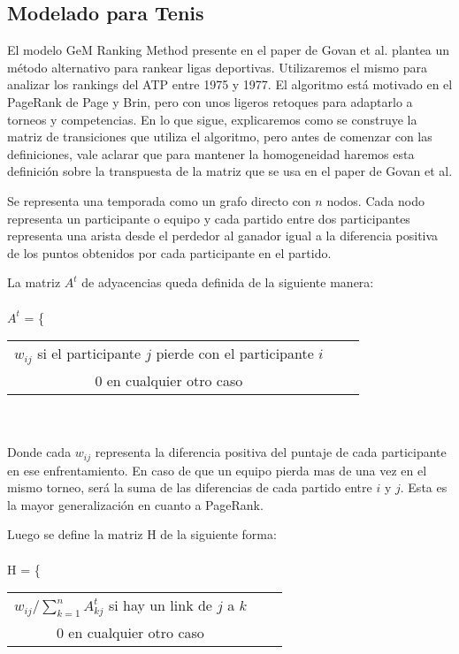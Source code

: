\subsection{Modelado para Tenis}

El modelo GeM Ranking Method presente en el paper de Govan et al. plantea un método alternativo para rankear ligas deportivas. Utilizaremos el mismo para analizar los rankings del ATP entre 1975 y 1977. El algoritmo está motivado en el PageRank de Page y Brin, pero con unos ligeros retoques para adaptarlo a torneos y competencias.
En lo que sigue, explicaremos como se construye la matriz de transiciones que utiliza el algoritmo, pero antes de comenzar con las definiciones, vale aclarar que para mantener la homogeneidad haremos esta definición sobre la transpuesta de la matriz que se usa en el paper de Govan et al.

Se representa una temporada como un grafo directo con $n$ nodos. Cada nodo representa un participante o equipo y cada partido entre dos participantes representa una arista desde el perdedor al ganador igual a la diferencia positiva de los puntos obtenidos por cada participante en el partido.

La matriz $A^t$ de adyacencias queda definida de la siguiente manera: 
\\\\
$A^t$ = \Bigg\{
  \begin{tabular}{ccc}
  $w_{ij}$ si el participante $j$ pierde con el participante $i$ \\
  0 en cualquier otro caso 
  \end{tabular}
\\\\
Donde cada $w_{ij}$ representa la diferencia positiva del puntaje de cada participante en ese enfrentamiento. En caso de que un equipo pierda mas de una vez en el mismo torneo, será la suma de las diferencias de cada partido entre $i$ y $j$. Esta es la mayor generalización en cuanto a PageRank.

Luego se define la matriz H de la siguiente forma:
\\\\
H = \Bigg\{
  \begin{tabular}{ccc}
  $w_{ij} / \sum\limits_{k=1}^n A^t_{kj} $ si hay un link de $j$ a $k$ \\
  0 en cualquier otro caso 
  \end{tabular}
\\\\

